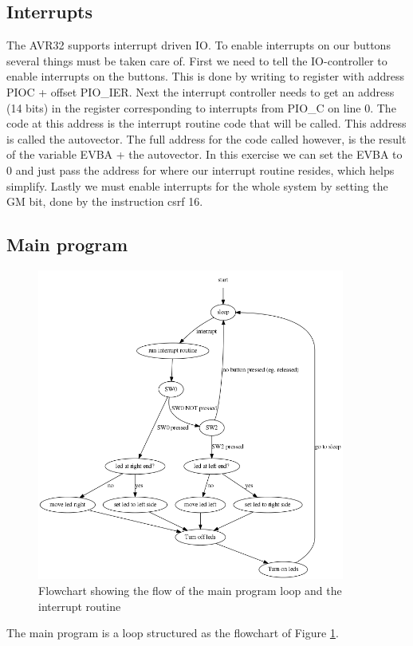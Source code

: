 \subsection{Interrupts}

The AVR32 supports interrupt driven IO. To enable interrupts on our buttons several things must be taken care of. First we need to tell the IO-controller to enable interrupts on the buttons. This is done by writing to register with address PIOC + offset PIO\_IER. Next the interrupt controller needs to get an address (14 bits) in the register corresponding to interrupts from PIO\_C on line 0. The code at this address is the interrupt routine code that will be called. This address is called the autovector. The full address for the code called however, is the result of the variable EVBA + the autovector. In this exercise we can set the EVBA to 0 and just pass the address for where our interrupt routine resides, which helps simplify. Lastly we must enable interrupts for the whole system by setting the GM bit, done by the instruction csrf 16.

\subsection{Main program}
\begin{figure}[here]
\includegraphics[width=0.9\textwidth]{img/graph.png}
\caption{Flowchart showing the flow of the main program loop and the interrupt routine}
\label{fig:mainflow}
\end{figure}

The main program is a loop structured as the flowchart of Figure \ref{fig:mainflow}. 

